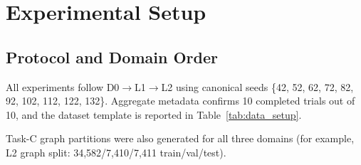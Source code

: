 \documentclass[journal]{IEEEtran}
\begin{document}
\begin{table}[H]
\caption{Policy bundle behavior used by the governance layer.}
\label{tab:policy_rules}
\centering
{}
\end{table}

\FloatBarrier
\section{Experimental Setup}
\subsection{Protocol and Domain Order}
All experiments follow D0$\rightarrow$L1$\rightarrow$L2 using canonical seeds \{42, 52, 62, 72, 82, 92, 102, 112, 122, 132\}. Aggregate metadata confirms 10 completed trials out of 10, and the dataset template is reported in Table~\ref{tab:data_setup}.

\begin{table}[H]
\caption{Dataset setup and split sizes (seed 42 canonical template).}
\label{tab:data_setup}
\centering
{}
\end{table}

Task-C graph partitions were also generated for all three domains (for example, L2 graph split: 34,582/7,410/7,411 train/val/test).
\end{document}
